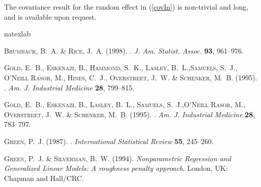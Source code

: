 \documentclass[article,lineno]{biometrika}
\begin{document}
\begin{remark}
The covariance result for the random effect in (\ref{covIn}) is non-trivial and long, and is available upon request.
\end{remark}

%
%

\begin{thebibliography}{7}
\expandafter\ifx\csname natexlab\endcsname\relax\def\natexlab#1{#1}\fi

\textsc{Brumback, B.~A.} \& \textsc{Rice, J.~A.} (1998).
.
\newblock \textit{J. Am. Statist. Assoc.} \textbf{93}, 961--976.

\textsc{Gold, E.~B.}, \textsc{Eskenazi, B.}, \textsc{Hammond, S.~K.}, \textsc{Lasley, B.~L.},\textsc{Samuels, S.~J.}, \textsc{O'Neill Rasor, M.},  \textsc{Hines, C.~J.}, \textsc{Overstreet, J.~W.} \& \textsc{Schenker, M.~B.} (1995).
.
\newblock \textit{Am. J. Industrial Medicine} \textbf{28}, 799--815.

\textsc{Gold, E.~B.}, \textsc{Eskenazi, B.}, \textsc{Lasley, B.~L.}, \textsc{Samuels, S.~J.},\textsc{O'Neill Rasor, M.}, \textsc{Overstreet, J.~W.} \& \textsc{Schenker, M.~B.}
  (1995).
.
\newblock \textit{Am. J. Industrial Medicine} \textbf{28}, 783--797.

\textsc{Green, P.~J.}  (1987).
.
\newblock \textit{International Statistical Review} \textbf{55}, 245--260.

\textsc{Green, P.~J.} \& \textsc{Silverman, B.~W.} (1994).
\newblock \textit{{Nonparametric Regression and Generalized Linear Models: A roughness penalty approach}}.
\newblock London, UK: Chapman and Hall/CRC.


\end{thebibliography}
\end{document}
